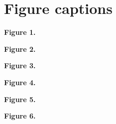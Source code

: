


\ifsubmission
\processdelayedfloats
\clearpage
\section*{Figure captions}
\noindent\textbf{Figure 1.} \capPipeline\par\medskip
\noindent\textbf{Figure 2.} \capMean\par\medskip
\noindent\textbf{Figure 3.} \capPCs\par\medskip
\noindent\textbf{Figure 4.} \capBand\par\medskip
\noindent\textbf{Figure 5.} \capRtwo\par\medskip
\noindent\textbf{Figure 6.} \capWindow\par
\fi
